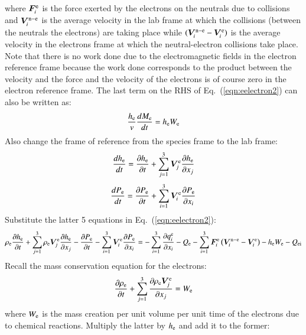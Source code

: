 \documentclass{warpdoc}
\renewcommand{\vec}[1]{\bm{#1}}
\begin{document}
%
where $\vec{F}_i^{\rm e}$ is the force exerted by the electrons on the neutrals due to collisions and $\vec{V}_i^{{\rm n}-{\rm e}}$ is the average velocity in the lab frame at which the collisions (between the neutrals the electrons) are taking place while $(\vec{V}_i^{{\rm n}-{\rm e}}-\vec{V}_i^{\rm e})$ is the average velocity in the electrons frame at which the neutral-electron collisions take place. Note that there is no work done due to the electromagnetic fields in the electron reference frame because the work done corresponds to the product between the velocity and the force and the velocity of the electrons is of course zero in the electron reference frame.   The last term on the RHS of Eq.\ (\ref{eqn:eelectron2}) can also be written as:
%
\begin{equation}
  \frac{h_{\rm e}}{v}\frac{d M_{\rm e}}{d t} = h_{\rm e} W_{\rm e}
\end{equation}
%
Also change the frame of reference from the species frame to the lab frame:
%
\begin{equation}
\frac{d h_{\rm e}}{d t} = \frac{\partial h_{\rm e}}{\partial t} + \sum_{j=1}^3 \vec{V}^{\rm e}_j \frac{\partial h_{\rm e}}{\partial x_j}
\end{equation}
%
%
\begin{equation}
\frac{d P_{\rm e}}{d t} = \frac{\partial P_{\rm e}}{\partial t} + \sum_{i=1}^3 \vec{V}^{\rm e}_i \frac{\partial P_{\rm e}}{\partial x_i}
\end{equation}
%
Substitute the latter 5 equations in Eq.\ (\ref{eqn:eelectron2}):
%
\begin{equation}
\rho_{\rm e} \frac{\partial h_{\rm e}}{\partial t} + \sum_{j=1}^3 \rho_{\rm e} \vec{V}^{\rm e}_j \frac{\partial h_{\rm e}}{\partial x_j} 
- \frac{\partial P_{\rm e}}{\partial t} - \sum_{i=1}^3 \vec{V}^{\rm e}_i \frac{\partial P_{\rm e}}{\partial x_i}
= 
-\sum_{i=1}^{3}\frac{\partial q_i^{\rm e}}{\partial x_i}
-Q_{\rm e}
-\sum_{i=1}^3 \vec{F}_i^{\rm e} \left( \vec{V}_i^{{\rm n}-{\rm e}}-\vec{V}_i^{\rm e} \right)
-h_{\rm e} W_{\rm e} - Q_{\rm ei}
\label{eqn:eelectron3}
\end{equation}
%  
Recall the mass conservation equation for the electrons:
%
\begin{equation}
\frac{\partial \rho_{\rm e}}{\partial t}+ \sum_{j=1}^3 \frac{\partial \rho_{\rm e} \vec{V}^{\rm e}_j}{\partial x_j}=W_{\rm e} 
\end{equation}
%
where $W_{\rm e}$ is the mass creation per unit volume per unit time of the electrons due to chemical reactions. Multiply the latter by $h_{\rm e}$ and add it to the former:
\end{document}
